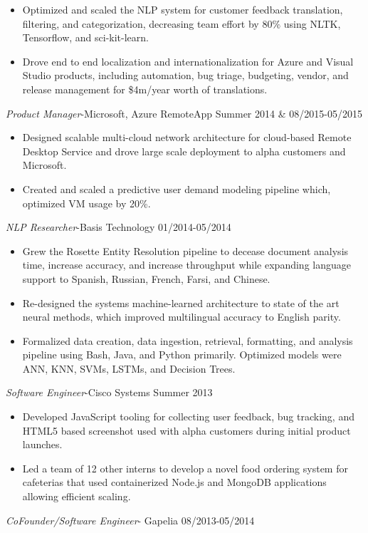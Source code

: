 \documentclass[line,margin]{res}
\begin{document}
\begin{resume}
\begin{itemize}
\item Optimized and scaled the NLP system for customer feedback translation, filtering, and categorization, decreasing team effort by $80\%$ using NLTK, Tensorflow, and sci-kit-learn.
\item Drove end to end localization and internationalization for Azure and Visual Studio products, including automation, bug triage, budgeting, vendor, and release management for \$4m/year worth of translations.
\end{itemize}
{\sl Product Manager}-Microsoft, Azure RemoteApp  \hfill Summer 2014 \& 08/2015-05/2015
\begin{itemize}  \itemsep -4pt
\item Designed scalable multi-cloud network architecture for cloud-based Remote Desktop Service and drove large scale deployment to alpha customers and Microsoft.
\item Created and scaled a predictive user demand modeling pipeline which, optimized VM usage by 20\%.
\end{itemize}
{\sl NLP Researcher}-Basis Technology \hfill 01/2014-05/2014
\begin{itemize}  \itemsep -4pt
\item Grew the Rosette Entity Resolution pipeline to decease document analysis time, increase accuracy, and increase throughput while expanding language support to Spanish, Russian, French, Farsi, and Chinese.
\item Re-designed the systems machine-learned architecture to state of the art neural methods, which improved multilingual accuracy to English parity.
\item Formalized data creation, data ingestion, retrieval, formatting, and analysis pipeline using Bash, Java, and Python primarily. Optimized models were ANN, KNN, SVMs, LSTMs, and Decision Trees.
\end{itemize}
{\sl Software Engineer}-Cisco Systems \hfill Summer 2013
\begin{itemize}  \itemsep -4pt
\item Developed JavaScript tooling for collecting user feedback, bug tracking, and HTML5 based screenshot used with alpha customers during initial product launches. 
\item Led a team of 12 other interns to develop a novel food ordering system for cafeterias that used containerized Node.js and MongoDB applications allowing efficient scaling.
\end{itemize}
{\sl CoFounder/Software Engineer}- Gapelia \hfill 08/2013-05/2014

\end{resume}
\end{document}
